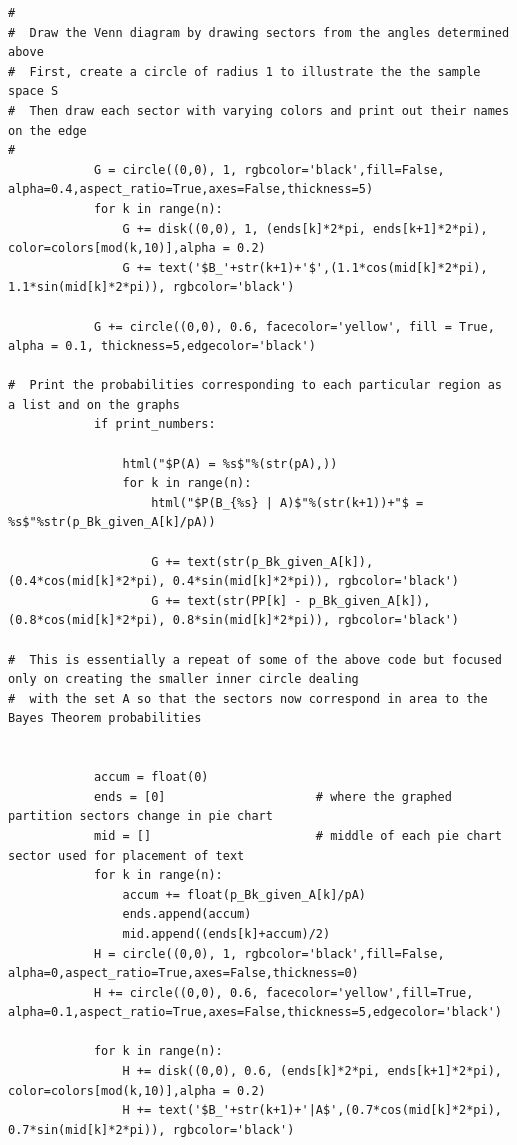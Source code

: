 \documentclass[10pt,]{book}
\theoremstyle{plain}
\theoremstyle{definition}
\theoremstyle{definition}
\numberwithin{equation}{section}
\begin{document}
\begin{lstlisting}[style=sageinput]
#        
#  Draw the Venn diagram by drawing sectors from the angles determined above
#  First, create a circle of radius 1 to illustrate the the sample space S
#  Then draw each sector with varying colors and print out their names on the edge
#
            G = circle((0,0), 1, rgbcolor='black',fill=False, alpha=0.4,aspect_ratio=True,axes=False,thickness=5)
            for k in range(n):
                G += disk((0,0), 1, (ends[k]*2*pi, ends[k+1]*2*pi), color=colors[mod(k,10)],alpha = 0.2)
                G += text('$B_'+str(k+1)+'$',(1.1*cos(mid[k]*2*pi), 1.1*sin(mid[k]*2*pi)), rgbcolor='black')
                
            G += circle((0,0), 0.6, facecolor='yellow', fill = True, alpha = 0.1, thickness=5,edgecolor='black') 
    
#  Print the probabilities corresponding to each particular region as a list and on the graphs
            if print_numbers:               

                html("$P(A) = %s$"%(str(pA),))
                for k in range(n):
                    html("$P(B_{%s} | A)$"%(str(k+1))+"$ = %s$"%str(p_Bk_given_A[k]/pA))
                                        
                    G += text(str(p_Bk_given_A[k]),(0.4*cos(mid[k]*2*pi), 0.4*sin(mid[k]*2*pi)), rgbcolor='black')
                    G += text(str(PP[k] - p_Bk_given_A[k]),(0.8*cos(mid[k]*2*pi), 0.8*sin(mid[k]*2*pi)), rgbcolor='black')
        
#  This is essentially a repeat of some of the above code but focused only on creating the smaller inner circle dealing
#  with the set A so that the sectors now correspond in area to the Bayes Theorem probabilities


            accum = float(0)                        
            ends = [0]                     # where the graphed partition sectors change in pie chart 
            mid = []                       # middle of each pie chart sector used for placement of text
            for k in range(n): 
                accum += float(p_Bk_given_A[k]/pA) 
                ends.append(accum)
                mid.append((ends[k]+accum)/2)
            H = circle((0,0), 1, rgbcolor='black',fill=False, alpha=0,aspect_ratio=True,axes=False,thickness=0)
            H += circle((0,0), 0.6, facecolor='yellow',fill=True, alpha=0.1,aspect_ratio=True,axes=False,thickness=5,edgecolor='black')
            
            for k in range(n):
                H += disk((0,0), 0.6, (ends[k]*2*pi, ends[k+1]*2*pi), color=colors[mod(k,10)],alpha = 0.2)
                H += text('$B_'+str(k+1)+'|A$',(0.7*cos(mid[k]*2*pi), 0.7*sin(mid[k]*2*pi)), rgbcolor='black')
                    

\end{lstlisting}
\end{document}
